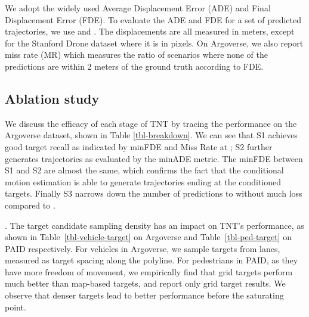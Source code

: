 \documentclass{article}
\newcommand{\model}{TNT\xspace}
\begin{document}
We adopt the widely used Average Displacement Error (ADE) and Final Displacement Error (FDE). To evaluate the ADE and FDE for a set of  predicted trajectories, we use  and . The displacements are all measured in meters, except for the Stanford Drone dataset where it is in pixels. On Argoverse, we also report miss rate (MR) which measures the ratio of scenarios where none of the predictions are within 2 meters of the ground truth according to FDE.



\subsection {Ablation study}

\label{sec:perf_break_down}
We discuss the efficacy of each stage of \model by tracing the performance on the Argoverse dataset, shown in Table \ref{tbl-breakdown}.
We can see that S1 achieves good target recall as indicated by minFDE and Miss Rate at ; S2 further generates trajectories as evaluated by the minADE metric. The minFDE between S1 and S2 are almost the same, which confirms the fact that the conditional motion estimation is able to generate trajectories ending at the conditioned targets. Finally S3 narrows down the number of predictions to  without much loss compared to .

.
The target candidate sampling density has an impact on TNT's performance, as shown in Table~\ref{tbl-vehicle-target} on Argoverse and Table~\ref{tbl-ped-target} on PAID respectively. For vehicles in Argoverse, we sample targets from lanes, measured as target spacing along the polyline. For pedestrians in PAID, as they have more freedom of movement, we empirically find that grid targets perform much better than map-based targets, and report only grid target results.
We observe that denser targets lead to better performance before the saturating point.
\end{document}
